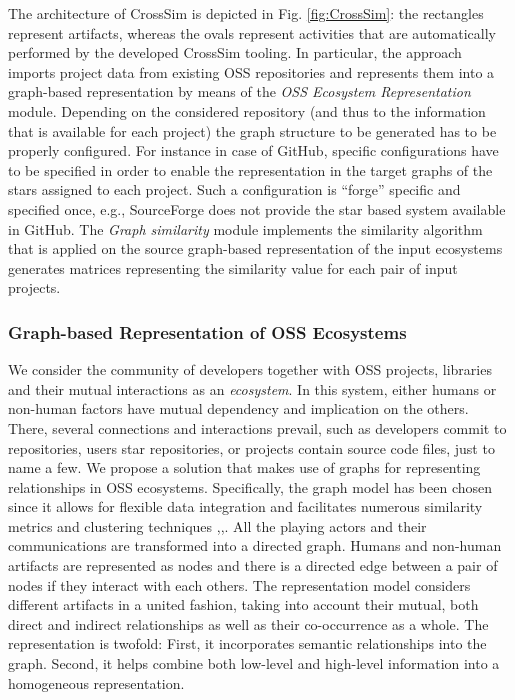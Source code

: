 The architecture of CrossSim is depicted in Fig. \ref{fig:CrossSim}: the rectangles represent artifacts, whereas the ovals represent activities that are automatically performed by the developed CrossSim tooling. In particular, the approach imports project data from existing OSS repositories and represents them into a graph-based representation by means of the \emph{OSS Ecosystem Representation} module. Depending on the considered repository (and thus to the information that is available for each project) the graph structure to be generated has to be properly configured. For instance in case of GitHub, specific configurations have to be specified in order to enable the representation in the target graphs of the stars assigned to each project. Such a configuration is ``forge'' specific and specified once, e.g., SourceForge does not provide the star based system available in GitHub. 
%
The \emph{Graph similarity} module implements the similarity algorithm that is applied on the source graph-based representation of the input ecosystems generates matrices representing the similarity value for each pair of input projects. 

\subsubsection{Graph-based Representation of OSS Ecosystems}
We consider the community of developers together with OSS projects, libraries and their mutual interactions as an \emph{ecosystem}. In this system, either humans or non-human factors have mutual dependency and implication on the others. There, several connections and interactions prevail, such as developers commit to repositories, users star repositories, or projects contain source code files, just to name a few. We propose a solution that makes use of graphs for representing relationships in OSS ecosystems. Specifically, the graph model has been chosen since it allows for flexible data integration and facilitates numerous similarity metrics and clustering techniques \cite{Blondel:2004:MSG:1035533.1035557},\cite{Lu2007},\cite{Schaeffer:2007:SGC:2296006.2296057}. All the playing actors and their communications are transformed into a directed graph. Humans and non-human artifacts are represented as nodes and there is a directed edge between a pair of nodes if they interact with each others. The representation model considers different artifacts in a united fashion, taking into account their mutual, both direct and indirect relationships as well as their co-occurrence as a whole. The representation is twofold: First, it incorporates semantic relationships into the graph. Second, it helps combine both low-level and high-level information into a homogeneous representation.



